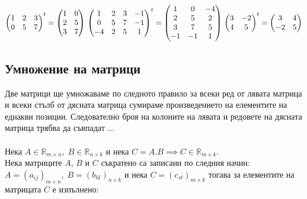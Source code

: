\documentclass[12pt]{article}
\newcommand{\R}{\mathbb{R}}
\begin{document}
$
\begin{pmatrix}
    1 & 2 & 3 \\
    0 & 5 & 7
\end{pmatrix}^t = \begin{pmatrix}
    1 & 0 \\
    2 & 5 \\
    3 & 7
\end{pmatrix} \\\\\\
\begin{pmatrix}
    1 & 2 & 3 & -1 \\
    0 & 5 & 7 & -1 \\
    -4 & 2 & 5 & 1
\end{pmatrix}^t = \begin{pmatrix}
    1 & 0 & -4 \\
    2 & 5 & 2 \\
    3 & 7 & 5 \\
    -1 & -1 & 1
\end{pmatrix} \\\\\\
\begin{pmatrix}
    3 & -2 \\
    4 & 5
\end{pmatrix}^t = \begin{pmatrix}
    3 & 4 \\
    -2 & 5
\end{pmatrix}
$

\subsection*{Умножение на матрици}

Две матрици ще умножаваме по следното правило за всеки ред от лявата матрица и всеки стълб от дясната матрица
сумираме произведението на елементите на еднакви позиции. Следователно броя на колоните на лявата и редовете на дясната матрица трябва да съвпадат ... \\\\

Нека $A \in \R_{m \times n}, \; B \in \R_{n \times k}$ и нека $C = A.B \implies C \in \R_{m \times k}$. \\

Нека матриците $A$, $B$ и $C$ съкратено са записани по следния начин: \\

$A = (a_{ij})_{m \times n}, \; B = (b_{hl})_{n \times k}$ и нека $C = (c_{st})_{m \times k}$ тогава за елементите на матрицата $C$ е изпълнено: \\
\end{document}
